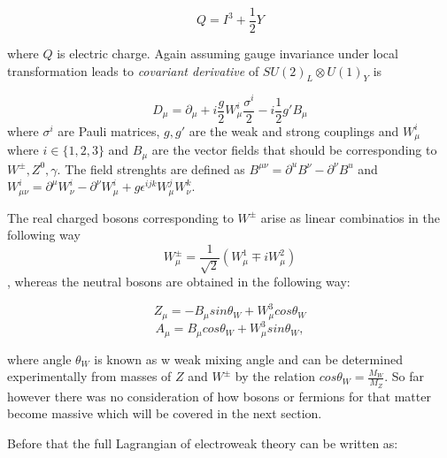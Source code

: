 \begin{equation}
Q=I^{3} + \frac{1}{2}Y
\end{equation}

where $Q$ is electric charge. Again assuming gauge invariance under local transformation leads to \textit{covariant derivative} of $SU(2)_{L}\otimes U(1)_{Y}$ is

\begin{equation}
	D_{\mu} = \partial_{\mu} + i\frac{g}{2}W_{\mu}^{i} \frac{\sigma^{i}}{2} - i \frac{1}{2}g'B_{\mu} 
\end{equation}
where $\sigma^{i}$ are Pauli matrices, $g,g'$ are the weak and strong couplings and $W_{\mu}^{i}$ where $i\in\{1,2,3\}$ and $B_{\mu}$ are the vector fields that should be corresponding to $W^{\pm},Z^{0},\gamma$.
The field strenghts are defined as $B^{\mu\nu}=\partial^{u}B^{\nu} - \partial^{\nu}B^{u}$ and $W^{i}_{\mu\nu} = \partial^{\mu}W^{i}_{\nu} - \partial^{\nu}W^{i}_{\mu}+ g\epsilon^{ijk}W_{\mu}^{j}W_{\nu}^{k}$.

The real charged bosons corresponding to $W^{\pm}$ arise as linear combinatios in the following way
\begin{equation}
W^{\pm}_{\mu} = \frac{1}{\sqrt{2}}(W^{1}_{\mu}\mp iW^{2}_{\mu})
\end{equation}, 
whereas the neutral bosons are obtained in the following way:


\begin{equation}
	Z_{\mu}=-B_{\mu}sin\theta_{W}+W^{3}_{\mu}cos\theta_{W}
\end{equation}
\begin{equation}
	A_{\mu}= B_{\mu}cos\theta_{W}+W^{3}_{\mu}sin\theta_{W},
\end{equation}

where angle $\theta_{W}$ is known as w weak mixing angle and can be determined experimentally from masses of $Z$ and $W^{\pm}$ by the relation
$cos\theta_{W} = \frac{M_{W}}{M_{Z}}$. So far however there was no consideration of how bosons or fermions for that matter become massive which will be covered in the next section.

Before that the full Lagrangian of electroweak theory can be written as:



